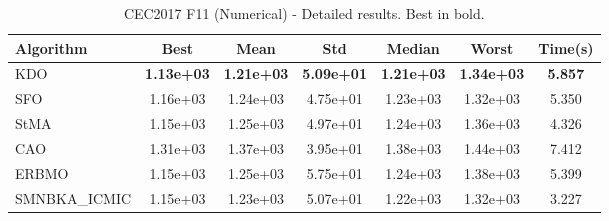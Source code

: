 \begin{table}[H]
\centering\small
\caption{CEC2017 F11 (Numerical) - Detailed results. Best in bold.}
\label{tab:cec2017_F11}
\begin{tabular}{lcccccc}
\toprule
\textbf{Algorithm} & \textbf{Best} & \textbf{Mean} & \textbf{Std} & \textbf{Median} & \textbf{Worst} & \textbf{Time(s)} \\
\midrule
KDO & \textbf{1.13e+03} & \textbf{1.21e+03} & \textbf{5.09e+01} & \textbf{1.21e+03} & \textbf{1.34e+03} & \textbf{5.857} \\
SFO & 1.16e+03 & 1.24e+03 & 4.75e+01 & 1.23e+03 & 1.32e+03 & 5.350 \\
StMA & 1.15e+03 & 1.25e+03 & 4.97e+01 & 1.24e+03 & 1.36e+03 & 4.326 \\
CAO & 1.31e+03 & 1.37e+03 & 3.95e+01 & 1.38e+03 & 1.44e+03 & 7.412 \\
ERBMO & 1.15e+03 & 1.25e+03 & 5.75e+01 & 1.24e+03 & 1.38e+03 & 5.399 \\
SMNBKA_ICMIC & 1.15e+03 & 1.23e+03 & 5.07e+01 & 1.22e+03 & 1.32e+03 & 3.227 \\
\bottomrule
\end{tabular}
\end{table}

